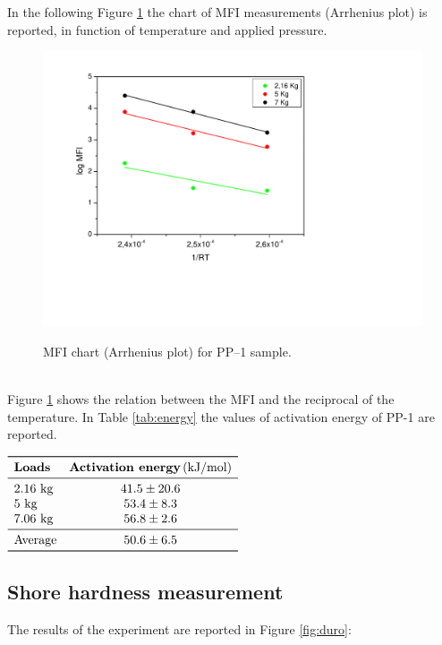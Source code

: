 \documentclass[a4paper, 11pt]{article}
\begin{document}
In the following Figure \ref{fig:arrhenius} the chart of MFI measurements (Arrhenius plot) is reported, in function of temperature and applied pressure. 
\begin{figure}[h!]
	\centering
	{\includegraphics[scale=0.4]{arrhenius}}
	\captionsetup{justification=centering}
	\caption{MFI chart (Arrhenius plot) for PP–1 sample.}
	\label{fig:arrhenius}
\end{figure}\\
Figure \ref{fig:arrhenius} shows the relation between the MFI and the reciprocal of the temperature. In Table \ref{tab:energy} the values of activation energy of PP-1 are reported.
\begin{table}[htp]
\centering
$
\begin{array}{lc}
\toprule
\textbf{Loads} & \textbf{Activation energy} \, \text{(kJ/mol)}  \\
\midrule
\text{2.16 kg} & 41.5 \pm 20.6  \\
\text{5 kg} & 53.4 \pm 8.3 \\
\text{7.06 kg} & 56.8 \pm 2.6  \\
\midrule
\text{Average} & 50.6 \pm 6.5 \\
\bottomrule
\end{array}
$
\caption{Activation energy for PP-1.}
\label{tab:energy}
\end{table}

\subsection{Shore hardness measurement}

The results of the experiment are reported in Figure \ref{fig:duro}:
\end{document}
